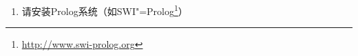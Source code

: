 {\begin{enumerate}
\eal
\ex 
\gll Der Mann hilft der Frau jetzt.\\
     \textsc{det}.\nom{} 男人 帮助 \textsc{det}.\dat{} 女人 现在\\
\ex 
\gll Der Mann hilft der Frau neben dem Bushäuschen.\\
     \textsc{det}.\nom{} 男人 帮助 \textsc{det}.\dat{} 女人 \textsc{prep} \textsc{det} 公交车候车亭\\
\ex 
\gll Er gibt ihr das Buch jetzt.\\
     他.\nom{} 给 她.\dat{} \textsc{det}.\acc{} 书 现在\\
\ex 
\gll Er gibt ihr das Buch neben dem Bushäuschen.\\
     他.\nom{} 给 她.\dat{} \textsc{det}.\acc{} 书 \textsc{prep} \textsc{det} 公交车候车亭\\
\ex 
\gll Er wartet jetzt auf ein Wunder.\\
     他.\nom{} 等 现在 \textsc{prep} 一 奇迹\\
\ex 
\gll Er wartet neben dem Bushäuschen auf ein Wunder.\\
      他.\nom{} 等 \textsc{prep} \textsc{det}.\dat{} 公交车候车亭 \textsc{prep} 一 奇迹\\
\zl
\item 请安装Prolog系统（如SWI"=Prolog\footnote{%
\url{http://www.swi-prolog.org} 
}）

\end{enumerate}}
